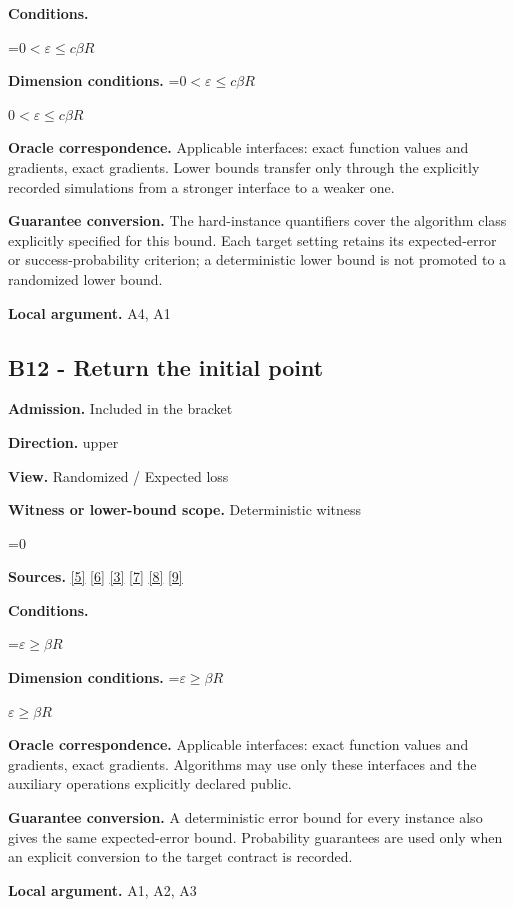 \documentclass[10pt,a4paper]{article}
\newcommand{\AtlasMath}[1]{\par\begingroup\centering\setbox0=\hbox{$\displaystyle #1$}\ifdim\wd0>1.4\linewidth\typeout{ATLAS WIDE FORMULA: \the\wd0}\fi\ifdim\wd0>\linewidth\resizebox{\linewidth}{!}{\box0}\else\box0\fi\par\endgroup}
\newcommand{\AtlasInlineMath}[1]{\begingroup\setbox0=\hbox{$#1$}\ifdim\wd0>.4\linewidth\endgroup\AtlasMath{#1}\else\endgroup$#1$\fi}
\begin{document}
\textbf{Conditions.} 
\AtlasMath{0<\varepsilon\le c\beta R}


\textbf{Dimension conditions.} \AtlasInlineMath{0<\varepsilon\le c\beta R}

\textbf{Oracle correspondence.} Applicable interfaces: exact function values and gradients, exact gradients. Lower bounds transfer only through the explicitly recorded simulations from a stronger interface to a weaker one.

\textbf{Guarantee conversion.} The hard-instance quantifiers cover the algorithm class explicitly specified for this bound. Each target setting retains its expected-error or success-probability criterion; a deterministic lower bound is not promoted to a randomized lower bound.

\textbf{Local argument.} A4, A1

\subsection{B12 - Return the initial point}
\textbf{Admission.} Included in the bracket

\textbf{Direction.} upper

\textbf{View.} Randomized / Expected loss

\textbf{Witness or lower-bound scope.} Deterministic witness

\AtlasMath{0}
\textbf{Sources.} \href{https://arxiv.org/pdf/2101.09740v2}{[5]} \href{https://arxiv.org/pdf/2609.33360v2}{[6]} \href{https://arxiv.org/pdf/2609.10874}{[3]} \href{https://arxiv.org/pdf/1405.4980}{[7]} \href{https://www2.isye.gatech.edu/~nemirovs/MOR_AccuracyCertificates.pdf}{[8]} \href{https://arxiv.org/pdf/2609.20701}{[9]}

\textbf{Conditions.} 
\AtlasMath{\varepsilon\ge\beta R}


\textbf{Dimension conditions.} \AtlasInlineMath{\varepsilon\ge\beta R}

\textbf{Oracle correspondence.} Applicable interfaces: exact function values and gradients, exact gradients. Algorithms may use only these interfaces and the auxiliary operations explicitly declared public.

\textbf{Guarantee conversion.} A deterministic error bound for every instance also gives the same expected-error bound. Probability guarantees are used only when an explicit conversion to the target contract is recorded.

\textbf{Local argument.} A1, A2, A3
\end{document}
